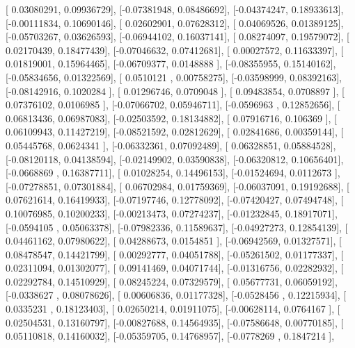 \documentclass{article}
\begin{document}
       [ 0.03080291,  0.09936729],
       [-0.07381948,  0.08486692],
       [-0.04374247,  0.18933613],
       [-0.00111834,  0.10690146],
       [ 0.02602901,  0.07628312],
       [ 0.04069526,  0.01389125],
       [-0.05703267,  0.03626593],
       [-0.06944102,  0.16037141],
       [ 0.08274097,  0.19579072],
       [ 0.02170439,  0.18477439],
       [-0.07046632,  0.07412681],
       [ 0.00027572,  0.11633397],
       [ 0.01819001,  0.15964465],
       [-0.06709377,  0.0148888 ],
       [-0.08355955,  0.15140162],
       [-0.05834656,  0.01322569],
       [ 0.0510121 ,  0.00758275],
       [-0.03598999,  0.08392163],
       [-0.08142916,  0.1020284 ],
       [ 0.01296746,  0.0709048 ],
       [ 0.09483854,  0.0708897 ],
       [ 0.07376102,  0.0106985 ],
       [-0.07066702,  0.05946711],
       [-0.0596963 ,  0.12852656],
       [ 0.06813436,  0.06987083],
       [-0.02503592,  0.18134882],
       [ 0.07916716,  0.106369  ],
       [ 0.06109943,  0.11427219],
       [-0.08521592,  0.02812629],
       [ 0.02841686,  0.00359144],
       [ 0.05445768,  0.0624341 ],
       [-0.06332361,  0.07092489],
       [ 0.06328851,  0.05884528],
       [-0.08120118,  0.04138594],
       [-0.02149902,  0.03590838],
       [-0.06320812,  0.10656401],
       [-0.0668869 ,  0.16387711],
       [ 0.01028254,  0.14496153],
       [-0.01524694,  0.0112673 ],
       [-0.07278851,  0.07301884],
       [ 0.06702984,  0.01759369],
       [-0.06037091,  0.19192688],
       [ 0.07621614,  0.16419933],
       [-0.07197746,  0.12778092],
       [-0.07420427,  0.07494748],
       [ 0.10076985,  0.10200233],
       [-0.00213473,  0.07274237],
       [-0.01232845,  0.18917071],
       [-0.0594105 ,  0.05063378],
       [-0.07982336,  0.11589637],
       [-0.04927273,  0.12854139],
       [ 0.04461162,  0.07980622],
       [ 0.04288673,  0.0154851 ],
       [-0.06942569,  0.01327571],
       [ 0.08478547,  0.14421799],
       [ 0.00292777,  0.04051788],
       [-0.05261502,  0.01177337],
       [ 0.02311094,  0.01302077],
       [ 0.09141469,  0.04071744],
       [-0.01316756,  0.02282932],
       [ 0.02292784,  0.14510929],
       [ 0.08245224,  0.07329579],
       [ 0.05677731,  0.06059192],
       [-0.0338627 ,  0.08078626],
       [ 0.00606836,  0.01177328],
       [-0.0528456 ,  0.12215934],
       [ 0.0335231 ,  0.18123403],
       [ 0.02650214,  0.01911075],
       [-0.00628114,  0.0764167 ],
       [ 0.02504531,  0.13160797],
       [-0.00827688,  0.14564935],
       [-0.07586648,  0.00770185],
       [ 0.05110818,  0.14160032],
       [-0.05359705,  0.14768957],
       [-0.0778269 ,  0.1847214 ],
\end{document}

